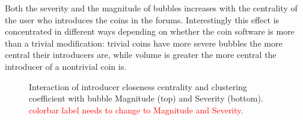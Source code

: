 Both the severity and the magnitude of bubbles increases with the centrality of the user who introduces the coins in the forums.  
Interestingly this effect is concentrated in different ways depending on whether the coin software is more than a trivial modification: trivial coins have more severe bubbles the more central their introducers are, while volume is greater the more central the introducer of a nontrivial coin is.






\begin{figure}[h]
\centering
\begin{subfigure}
{\texttt{[image: cluster\_closeness\_volume.pdf]}}
\vspace{-2\baselineskip}
\end{subfigure}
\begin{subfigure}
{\texttt{[image: cluster\_closeness\_severity.pdf]}}
\end{subfigure}
\caption{Interaction of introducer closeness centrality and clustering coefficient with bubble Magnitude (top) and Severity (bottom). \textcolor{red}{colorbar label needs to change to Magnitude and Severity.}}
\label{cluster_closeness_volume}
\end{figure}


